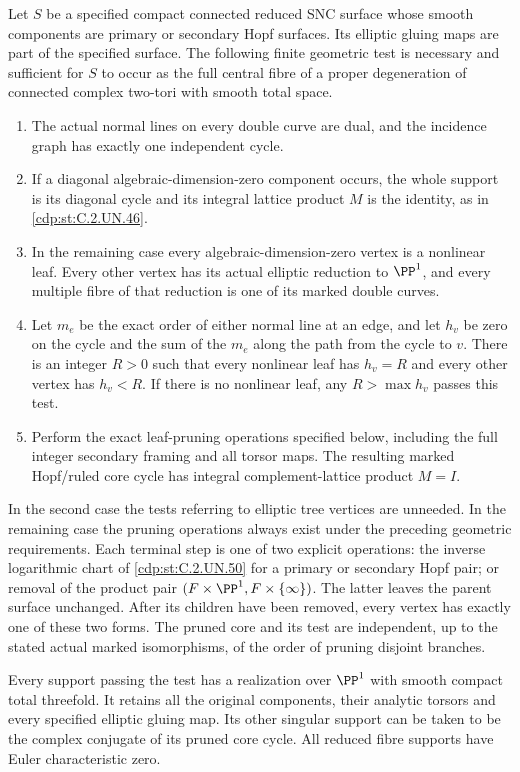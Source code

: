 
\begin{proposition}\label{cdp:st:C.2.UN.60}
Let $S$ be a specified compact connected reduced SNC surface whose
smooth components are primary or secondary Hopf surfaces. Its
elliptic gluing maps are part of the specified surface. The following
finite geometric test is necessary and sufficient for $S$ to occur
as the full central fibre of a proper degeneration of connected
complex two-tori with smooth total space.

\begin{enumerate}
\item The actual normal lines on every double curve are dual, and
the incidence graph has exactly one independent cycle.
\item If a diagonal algebraic-dimension-zero component occurs, the
whole support is its diagonal cycle and its integral lattice product
$M$ is the identity, as in \ref{cdp:st:C.2.UN.46}.
\item In the remaining case every algebraic-dimension-zero vertex
is a nonlinear leaf. Every other vertex has its actual elliptic
reduction to $\PP^1$, and every multiple fibre of that reduction
is one of its marked double curves.
\item Let $m_e$ be the exact order of either normal line at an edge,
and let $h_v$ be zero on the cycle and the sum of the $m_e$ along
the path from the cycle to $v$. There is an integer $R>0$ such that
every nonlinear leaf has $h_v=R$ and every other vertex has $h_v<R$.
If there is no nonlinear leaf, any $R>\max h_v$ passes this test.
\item Perform the exact leaf-pruning operations specified below,
including the full integer secondary framing and all torsor maps.
The resulting marked Hopf/ruled core cycle has integral
complement-lattice product $M=I$.
\end{enumerate}

In the second case the tests referring to elliptic tree vertices are
unneeded. In the remaining case the pruning operations always exist
under the preceding geometric requirements. Each terminal step is
one of two explicit operations: the inverse logarithmic chart of
\ref{cdp:st:C.2.UN.50} for a primary or secondary Hopf pair; or removal of the
product pair $(F\times\PP^1,F\times\{\infty\})$. The latter leaves
the parent surface unchanged. After its children have been removed,
every vertex has exactly one of these two forms. The pruned core
and its test are independent, up to the stated actual marked
isomorphisms, of the order of pruning disjoint branches.

Every support passing the test has a realization over $\PP^1$
with smooth compact total threefold. It retains all the original
components, their analytic torsors and every specified elliptic
gluing map. Its other singular support can be taken to be the
complex conjugate of its pruned core cycle. All reduced fibre
supports have Euler characteristic zero.
\end{proposition}

